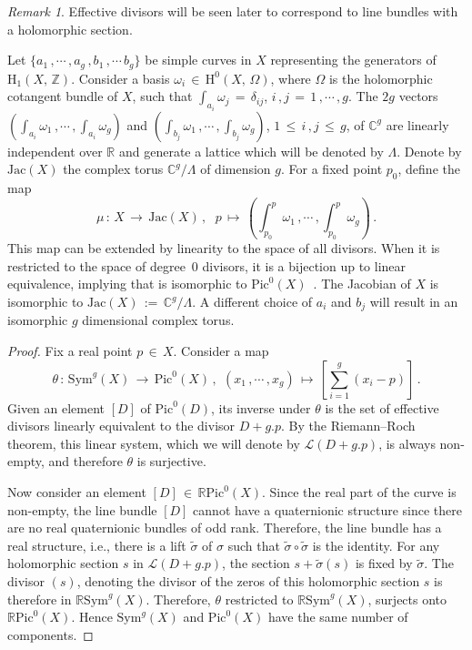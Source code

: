 \documentclass{article}
\theoremstyle{remark}
\newtheorem{remark}{Remark}
\begin{document}
\begin{remark}
  Effective divisors will be seen later to correspond to line bundles with a holomorphic section.
\end{remark}

Let $\{a_1\, ,\cdots\, , a_g\, , b_1\, , \cdots\, b_g\}$ be simple curves in $X$
representing the generators of 
$\mathrm{H}_1(X,\, \mathbb{Z})$. Consider a basis $\omega_i\,\in\, \mathrm{H}^0(X,\,
\Omega)$, where $\Omega$ is the holomorphic cotangent bundle of $X$, such that 
$\int_{a_i} \omega_j\,=\,\delta_{ij}$, $i\, ,j\,=\,1\, ,\cdots\, ,g$. The $2g$ vectors
$(\int_{a_i}\omega_1\, , \cdots\, , \int_{a_i} \omega_g)$ and $(\int_{b_j} \omega_1\, , 
\cdots\, , \int_{b_j} \omega_g)$, $1\,\leq\, i\, , j\,\leq\, g$, of $\mathbb{C}^g$ are 
linearly independent over $\mathbb{R}$ and generate a lattice which will be denoted by 
$\Lambda$. Denote by $\mathrm{Jac}(X)$ the complex torus $\mathbb{C}^g/\Lambda$ of
dimension $g$. 
For a fixed point $p_0$, define the map
$$\mu\, :\, X\,\longrightarrow\, \mathrm{Jac}(X)\, ,\,\  ~ 
p\,\longmapsto\, (\int_{p_0}^p \omega_1\, , \cdots\, , \int_{p_0}^p 
\omega_g)\, .$$ This map can be extended by linearity to the space of all divisors. When it 
is restricted to the space of degree~0 divisors, it is a bijection up to linear 
equivalence, implying that is isomorphic to $\mathrm{Pic}^0(X)$~\cite{arbarello1985geometry}. The Jacobian of $X$ is 
isomorphic to $\mathrm{Jac}(X)\,:=\,\mathbb{C}^g/\Lambda$. A different choice of $a_i$ and 
$b_j$ will result in an isomorphic $g$ dimensional complex torus.

\begin{proof}
  Fix a real point $p\,\in\, X$. Consider a map $$\theta\,:\, \mathrm{Sym}^g(X) \,\longrightarrow\, \mathrm{Pic}^0(X)
\, ,\,\ (x_1\, ,\cdots\, ,x_g) \,\longmapsto\, [\displaystyle\sum_{i=1}^g (x_i-p)]\, .$$ Given an element $[D]$
of  $\mathrm{Pic}^0(D)$, its inverse under $\theta$ is the set of effective divisors linearly equivalent to the 
divisor $D+g.p$. By the Riemann--Roch theorem, this linear system, which we will denote by $\mathcal{L}(D+g.p)$, is always
non-empty, and therefore $\theta$ is surjective.

Now consider an element $[D]\,\in\, \mathbb{R}\mathrm{Pic}^0(X)$. Since the real 
part of the curve is non-empty, the line bundle $[D]$ cannot have a quaternionic 
structure since there are no real quaternionic bundles of odd rank. Therefore, the 
line bundle has a real structure, i.e., there is a lift $\widetilde{\sigma}$ of 
$\sigma$ such that $\widetilde{\sigma} \circ \widetilde{\sigma}$ is the identity. 
For any holomorphic section $s$ in $\mathcal{L}(D+g.p)$, the section 
$s+\widetilde{\sigma}(s)$ is fixed by $\widetilde{\sigma}$. The divisor $(s)$, 
denoting the divisor of the zeros of this holomorphic section $s$ is therefore in 
$\mathbb{R}\mathrm{Sym}^{g}(X)$. Therefore, $\theta$ restricted to 
$\mathbb{R}\mathrm{Sym}^{g}(X)$, surjects onto $\mathbb{R}\mathrm{Pic}^0(X)$. Hence 
$\mathrm{Sym}^g(X)$ and $\mathrm{Pic}^0(X)$ have the same number of components.
\end{proof}
\end{document}
